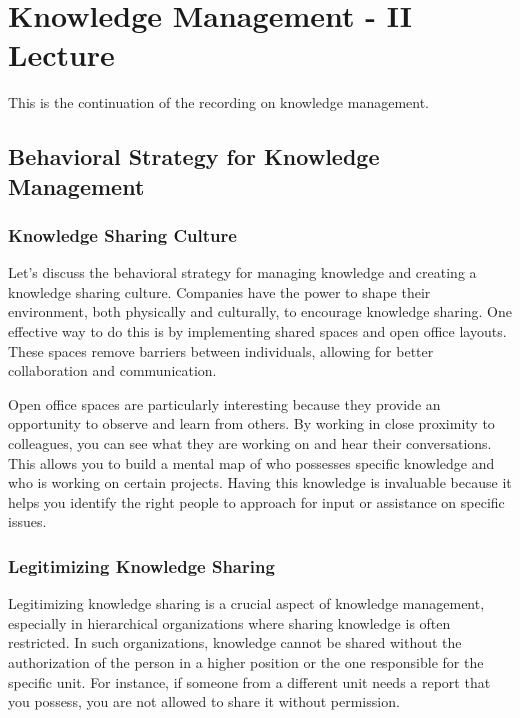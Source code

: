 \section{Knowledge Management - II Lecture}

This is the continuation of the
recording on knowledge management.

\subsection{Behavioral Strategy for Knowledge
    Management}\label{behavioral-strategy-for-knowledge-management}

\subsubsection{Knowledge Sharing Culture}\label{knowledge-sharing-culture}

Let's discuss the behavioral strategy for managing knowledge and
creating a knowledge sharing culture. Companies have the power to shape
their environment, both physically and culturally, to encourage
knowledge sharing. One effective way to do this is by implementing
shared spaces and open office layouts. These spaces remove barriers
between individuals, allowing for better collaboration and
communication.

Open office spaces are particularly interesting because they provide an
opportunity to observe and learn from others. By working in close
proximity to colleagues, you can see what they are working on and hear
their conversations. This allows you to build a mental map of who
possesses specific knowledge and who is working on certain projects.
Having this knowledge is invaluable because it helps you identify the
right people to approach for input or assistance on specific issues.

\subsubsection{Legitimizing Knowledge
    Sharing}\label{legitimizing-knowledge-sharing}

Legitimizing knowledge sharing is a crucial aspect of knowledge
management, especially in hierarchical organizations where sharing
knowledge is often restricted. In such organizations, knowledge cannot
be shared without the authorization of the person in a higher position
or the one responsible for the specific unit. For instance, if someone
from a different unit needs a report that you possess, you are not
allowed to share it without permission.

